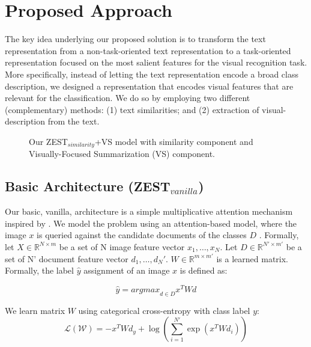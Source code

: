 \documentclass[11pt,a4paper]{article}
\newcommand\gal[1]{\textcolor{bright}{\textbf{GAL:} #1 }}
\begin{document}
\section{Proposed Approach}
\label{task}

The key idea underlying our proposed solution is to transform the text representation from a non-task-oriented text representation to a task-oriented representation  focused on the most salient features for the visual recognition task. More specifically, instead of letting the text representation encode a broad class description, we designed a representation that encodes visual features that are relevant for the classification. We do so by employing two different (complementary) methods: (1) text similarities; and (2) extraction of visual-description from the text.




\begin{figure}[th]
\centering
{}
 \caption{Our ZEST$_{similarity}$+VS model with similarity component and Visually-Focused Summarization (VS) component.}
\label{fig:data}
\end{figure}
\subsection{Basic Architecture (ZEST$_{vanilla}$)}
\label{section_ZEST_C}


Our basic, vanilla, architecture is a simple multiplicative attention mechanism \cite{luong2015effective} inspired by \citet{romera2015embarrassingly}. We model the problem using an attention-based model, where the image $x$ is queried
against the candidate documents of the classes $D$ .
Formally, let $X\in \mathbb{R}^{N\times m}$ be a set of N image feature vector $x_1,\ldots,x_N$.
Let  $D\in \mathbb{R}^{N'\times m'}$ be a set of N' document feature vector  $d_1,\ldots,d_N'$.  %
 \(W\in  \mathbb{R}^{m\times m'}\) is a learned matrix.  Formally, the label $\hat{y}$ assignment of an image $x$ is defined as:
 
\begin{equation}
    \label{equation:attention}
    \hat{y}={argmax}_{d\in D}x^TWd
\end{equation}



We learn matrix $W$ using categorical cross-entropy with class label $y$: 
\begin{equation}
    \label{equation:attention}
    \mathcal{L(W)}=-x^TWd_y  +\log\left(\sum_{i=1}^{N'} \exp(x^TWd_i)  \right)
\end{equation}
\end{document}
